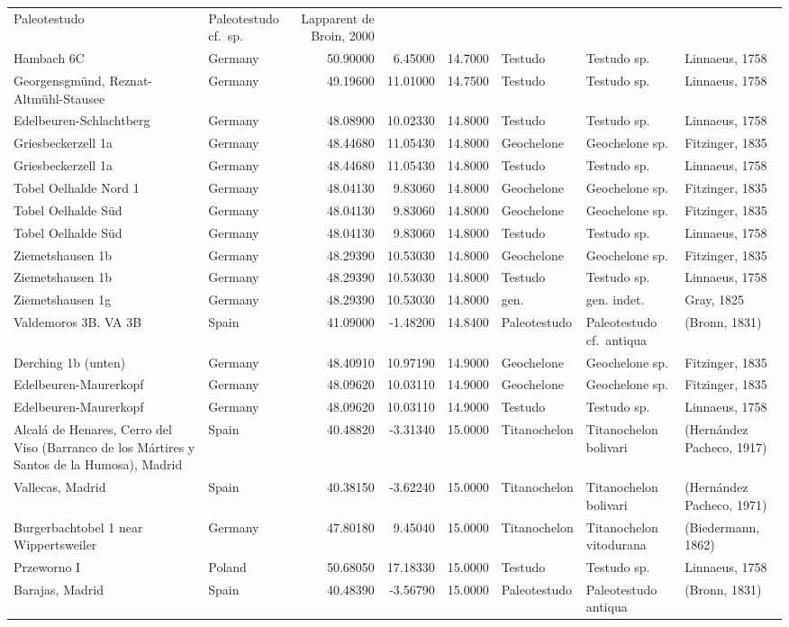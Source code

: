 \documentclass[]{article}
\begin{document}
\begin{longtable}[]{@{}llrrrlll@{}}
Paleotestudo & Paleotestudo cf.~sp. & Lapparent de Broin,
2000\tabularnewline
Hambach 6C & Germany & 50.90000 & 6.45000 & 14.7000 & Testudo & Testudo
sp. & Linnaeus, 1758\tabularnewline
Georgensgmünd, Reznat-Altmühl-Stausee & Germany & 49.19600 & 11.01000 &
14.7500 & Testudo & Testudo sp. & Linnaeus, 1758\tabularnewline
Edelbeuren-Schlachtberg & Germany & 48.08900 & 10.02330 & 14.8000 &
Testudo & Testudo sp. & Linnaeus, 1758\tabularnewline
Griesbeckerzell 1a & Germany & 48.44680 & 11.05430 & 14.8000 &
Geochelone & Geochelone sp. & Fitzinger, 1835\tabularnewline
Griesbeckerzell 1a & Germany & 48.44680 & 11.05430 & 14.8000 & Testudo &
Testudo sp. & Linnaeus, 1758\tabularnewline
Tobel Oelhalde Nord 1 & Germany & 48.04130 & 9.83060 & 14.8000 &
Geochelone & Geochelone sp. & Fitzinger, 1835\tabularnewline
Tobel Oelhalde Süd & Germany & 48.04130 & 9.83060 & 14.8000 & Geochelone
& Geochelone sp. & Fitzinger, 1835\tabularnewline
Tobel Oelhalde Süd & Germany & 48.04130 & 9.83060 & 14.8000 & Testudo &
Testudo sp. & Linnaeus, 1758\tabularnewline
Ziemetshausen 1b & Germany & 48.29390 & 10.53030 & 14.8000 & Geochelone
& Geochelone sp. & Fitzinger, 1835\tabularnewline
Ziemetshausen 1b & Germany & 48.29390 & 10.53030 & 14.8000 & Testudo &
Testudo sp. & Linnaeus, 1758\tabularnewline
Ziemetshausen 1g & Germany & 48.29390 & 10.53030 & 14.8000 & gen. & gen.
indet. & Gray, 1825\tabularnewline
Valdemoros 3B. VA 3B & Spain & 41.09000 & -1.48200 & 14.8400 &
Paleotestudo & Paleotestudo cf.~antiqua & (Bronn, 1831)\tabularnewline
Derching 1b (unten) & Germany & 48.40910 & 10.97190 & 14.9000 &
Geochelone & Geochelone sp. & Fitzinger, 1835\tabularnewline
Edelbeuren-Maurerkopf & Germany & 48.09620 & 10.03110 & 14.9000 &
Geochelone & Geochelone sp. & Fitzinger, 1835\tabularnewline
Edelbeuren-Maurerkopf & Germany & 48.09620 & 10.03110 & 14.9000 &
Testudo & Testudo sp. & Linnaeus, 1758\tabularnewline
Alcalá de Henares, Cerro del Viso (Barranco de los Mártires y Santos de
la Humosa), Madrid & Spain & 40.48820 & -3.31340 & 15.0000 &
Titanochelon & Titanochelon bolivari & (Hernández Pacheco,
1917)\tabularnewline
Vallecas, Madrid & Spain & 40.38150 & -3.62240 & 15.0000 & Titanochelon
& Titanochelon bolivari & (Hernández Pacheco, 1971)\tabularnewline
Burgerbachtobel 1 near Wippertsweiler & Germany & 47.80180 & 9.45040 &
15.0000 & Titanochelon & Titanochelon vitodurana & (Biedermann,
1862)\tabularnewline
Przeworno I & Poland & 50.68050 & 17.18330 & 15.0000 & Testudo & Testudo
sp. & Linnaeus, 1758\tabularnewline
Barajas, Madrid & Spain & 40.48390 & -3.56790 & 15.0000 & Paleotestudo &
Paleotestudo antiqua & (Bronn, 1831)\tabularnewline

\end{longtable}
\end{document}
